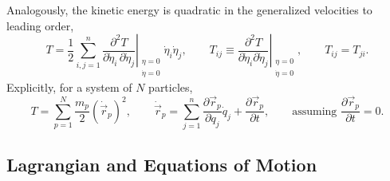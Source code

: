 \documentclass[11pt]{article}
\begin{document}
Analogously, the kinetic energy is quadratic in the generalized velocities to leading order,
\begin{equation}
T = \frac12\sum_{i,j=1}^{n} \left.\frac{\partial^2 T}{\partial\dot\eta_i\,\partial\dot\eta_j}\right|_{\substack{\eta=0\\\dot\eta=0}} \dot\eta_i\dot\eta_j, \qquad T_{ij}\equiv \left.\frac{\partial^2 T}{\partial \dot\eta_i \partial \dot\eta_j}\right|_{\substack{\eta=0\\\dot\eta=0}}, \qquad T_{ij}=T_{ji}.
\label{eq:T-def}
\end{equation}
Explicitly, for a system of $N$ particles,
\begin{equation}
T = \sum_{p=1}^{N}\frac{m_p}{2}\left(\dot{\vec r}_p\right)^2, \qquad \dot{\vec r}_p = \sum_{j=1}^{n}\frac{\partial \vec r_p}{\partial q_j}\dot q_j + \frac{\partial \vec r_p}{\partial t}, \qquad \text{assuming } \frac{\partial\vec r_p}{\partial t}=0.
\label{eq:T-particles}
\end{equation}

\subsection{Lagrangian and Equations of Motion}
\end{document}
